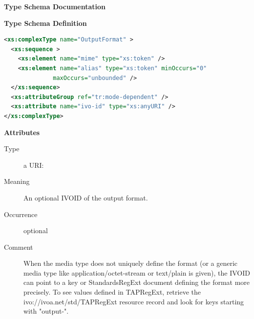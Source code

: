 \documentclass{ivoa}
\begin{document}
\begin{generated}
\begingroup
        \renewcommand*\descriptionlabel[1]{%
        \hbox to 5.5em{\emph{#1}\hfil}}\vspace{2ex}\noindent\textbf{ Type Schema Documentation}



\vspace{1ex}\noindent\textbf{ Type Schema Definition}

\begin{lstlisting}[language=XML,basicstyle=\footnotesize]
<xs:complexType name="OutputFormat" >
  <xs:sequence >
    <xs:element name="mime" type="xs:token" />
    <xs:element name="alias" type="xs:token" minOccurs="0"
              maxOccurs="unbounded" />
  </xs:sequence>
  <xs:attributeGroup ref="tr:mode-dependent" />
  <xs:attribute name="ivo-id" type="xs:anyURI" />
</xs:complexType>
\end{lstlisting}

\vspace{0.5ex}\noindent\textbf{ Attributes}

\begingroup\small\begin{bigdescription}
\item[ivo-id]
\begin{description}
\item[Type] a URI: 
\item[Meaning] An optional IVOID of the output format.
\item[Occurrence] optional
\item[Comment] When the media type does not uniquely define the
          format (or a generic media type like application/octet-stream or
          text/plain is given), the IVOID can point to a key
          or StandardsRegExt document defining the format more
          precisely.  To see values defined in TAPRegExt,
          retrieve the ivo://ivoa.net/std/TAPRegExt
          resource record and look for keys starting with {"}output-{"}.
\end{description}


\end{bigdescription}
\end{generated}
\end{document}
